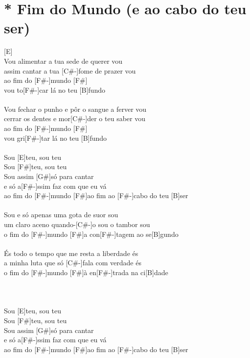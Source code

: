 \documentclass{article}
\begin{document}
\section{ * Fim do Mundo (e ao cabo do teu ser)}
[E]\\
[E]Vou alimentar a tua sede de querer vou\\
[F#-]assim cantar a tua [C#-]fome de prazer vou\\
[B]ao fim do [F#-]mundo [F#]\\
vou to[F#-]car lá no teu [B]fundo\\
\\
[E]Vou fechar o punho e pôr o sangue a ferver vou \\
[F#-]cerrar os dentes e mor[C#-]der o teu saber vou\\
[B]ao fim do [F#-]mundo [F#]\\
vou gri[F#-]tar lá no teu [B]fundo\\
\\
Sou [E]teu, sou teu\\
Sou [F#]teu, sou teu\\
[C#-]Sou assim [G#]só para cantar\\
[Fº7]e só a[F#-]ssim faz com que eu vá\\
[B]ao fim do [F#-]mundo [F#]ao fim ao [F#-]cabo do teu [B]ser\\
\\
[E]Sou e só apenas uma gota de suor sou\\
[F#-]um claro aceno quando-[C#-]o sou o tambor sou\\
[B]o fim do [F#-]mundo [F#]a con[F#-]tagem ao se[B]gundo\\
\\
[E]És todo o tempo que me resta a liberdade és\\
[F#-]a minha luta que só [C#-]fala com verdade és\\
[B]o fim do [F#-]mundo [F#]à en[F#-]trada na ci[B]dade\\
\\
[C#- G# Fº7 F#- A G# B F#- F# F#- B]\\
\\
Sou [E]teu, sou teu\\
Sou [F#]teu, sou teu\\
[C#-]Sou assim [G#]só para cantar\\
[Fº7]e só a[F#-]ssim faz com que eu vá\\
[B]ao fim do [F#-]mundo [F#]ao fim ao [F#-]cabo do teu [B]ser\\
\\
\end{document}

